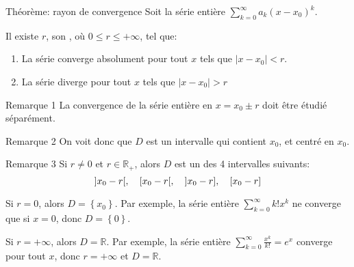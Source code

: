\documentclass[a4paper]{article}
\begin{document}
\begin{parag}{Théorème: rayon de convergence}
    Soit la série entière $\sum_{k=0}^{\infty} a_k\left(x - x_0\right)^{k}$.

    Il existe $r$, son , où $0 \leq r \leq +\infty$, tel que:
    \begin{enumerate}
        \item La série converge absolument pour tout $x$ tels que $\left|x - x_0\right| < r$.
        \item La série diverge pour tout $x$ tels que $\left|x - x_0\right| > r$
    \end{enumerate}

    \begin{subparag}{Remarque 1}
        La convergence de la série entière en $x = x_0 \pm r$ doit être étudié séparément.
    \end{subparag}

    \begin{subparag}{Remarque 2}
        On voit donc que $D$ est un intervalle qui contient $x_0$, et centré en $x_0$.
    \end{subparag}

    \begin{subparag}{Remarque 3}
        Si $r \neq 0$ et $r \in \mathbb{R}_+$, alors $D$ est un des 4 intervalles suivants:
        \[\left]x_0 - r\right[, \mathspace \left[x_0 - r\right[, \mathspace \left]x_0 - r\right], \mathspace \left[x_0 - r\right]  \]

        Si $r = 0$, alors $D = \left\{x_0\right\}$. Par exemple, la série entière $\sum_{k=0}^{\infty} k! x^k$ ne converge que si $x = 0$, donc $D = \left\{0\right\}$.

        Si $r = +\infty$, alors $D = \mathbb{R}$. Par exemple, la série entière $\sum_{k=0}^{\infty} \frac{x^k}{k!} = e^x$ converge pour tout $x$, donc $r = +\infty$ et $D = \mathbb{R}$.
    \end{subparag}
\end{parag}
\end{document}
